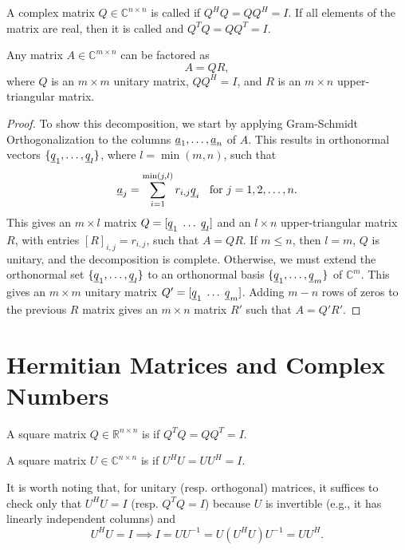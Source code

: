 A complex matrix $Q \in \mathbb{C}^{n \times n}$ is called  if $Q^H Q = Q Q^H = I$.
If all elements of the matrix are real, then it is called  and $Q^T Q = Q Q^T = I$.

\begin{theorem}
Any matrix $A \in \mathbb{C}^{m \times n}$ can be factored as
\begin{equation*}
A = Q R,
\end{equation*}
where $Q$ is an $m\times m$ unitary matrix, $QQ^H = I$, and $R$ is an $m\times n$ upper-triangular matrix.
\end{theorem}
\begin{proof}
To show this decomposition, we start by applying Gram-Schmidt Orthogonalization to the columns $\underline{a}_1,\ldots,\underline{a}_n$ of $A$.
This results in orthonormal vectors $\{ \underline{q}_1,\ldots,\underline{q}_l \}$, where $l=\min(m,n)$, such that
\[ \underline{a}_j = \sum_{i=1}^{\min(j,l)} r_{i,j} \underline{q}_i \;\; \textrm{ for } j=1,2,\ldots,n. \]
This gives an $m\times l$ matrix $Q=[ \underline{q}_1 \; \ldots \; \underline{q}_l ]$ and an $l \times n$ upper-triangular matrix $R$, with entries $[ R ]_{i,j} = r_{i,j}$, such that $A = QR$.
If $m \leq n$, then $l=m$, $Q$ is unitary, and the decomposition is complete.
Otherwise, we must extend the orthonormal set $\{ \underline{q}_1,\ldots,\underline{q}_l \}$ to an orthonormal basis $\{ \underline{q}_1,\ldots,\underline{q}_m \}$ of $\mathbb{C}^m$.
This gives an $m\times m$ unitary matrix $Q' = [ \underline{q}_1 \; \ldots \; \underline{q}_m ]$.
Adding $m-n$ rows of zeros to the previous $R$ matrix gives an $m\times n$ matrix $R'$ such that $A = Q' R'$.
\end{proof}

\section{Hermitian Matrices and Complex Numbers}

\begin{definition}
A square matrix $Q \in \mathbb{R}^{n \times n}$ is  if $Q^T Q = Q Q^T = I$.
\end{definition}

\begin{definition}
A square matrix $U \in \mathbb{C}^{n \times n}$ is  if $U^H U = U U^H = I$.
\end{definition}

It is worth noting that, for unitary (resp. orthogonal) matrices, it suffices to check only that $U^H U = I$ (resp. $Q^T Q = I$) because $U$ is invertible (e.g., it has linearly independent columns) and
\[ U^H U = I \implies I = U U^{-1} = U (U^H U) U^{-1} = U U^H. \]


